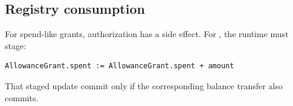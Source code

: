 
\subsection{Registry consumption}

For spend-like grants, authorization has a side effect. For , the runtime must stage:

\begin{lstlisting}
AllowanceGrant.spent := AllowanceGrant.spent + amount
\end{lstlisting}

That staged update \MUST{} commit only if the corresponding balance transfer also commits.
